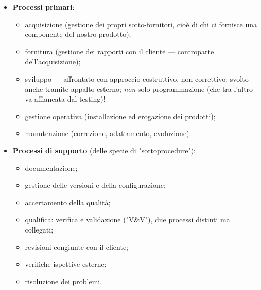 \documentclass[a4paper]{article}
\begin{document}
	\begin{itemize}
		
			
	\item \textbf{Processi primari}:
				
	\begin{itemize}
		
					
	\item acquisizione (gestione dei propri sotto-fornitori, cioè di chi ci fornisce una componente del nostro prodotto);
					
	\item fornitura (gestione dei rapporti con il cliente --- controparte dell'acquisizione);
					
	\item sviluppo --- affrontato con approccio costruttivo, non correttivo; svolto anche tramite appalto esterno; \emph{non} solo programmazione (che tra l'altro va affiancata dal testing)!
					
	\item gestione operativa (installazione ed erogazione dei prodotti);
					
	\item manutenzione (correzione, adattamento, evoluzione).
				
	\end{itemize}

			
			
	\item \textbf{Processi di supporto} (delle specie di "sottoprocedure"):
				
	\begin{itemize}
		
					
	\item documentazione;
					
	\item gestione delle versioni e della configurazione;
					
	\item accertamento della qualità;
					
	\item qualifica: verifica e validazione ("V\&{}V"), due processi distinti ma collegati;
					
	\item revisioni congiunte con il cliente;
					
	\item verifiche ispettive esterne;
					
	\item risoluzione dei problemi.
				

\end{itemize}
\end{itemize}
\end{document}

